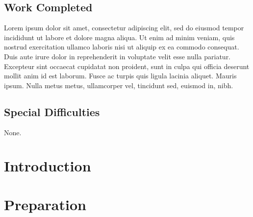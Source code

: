 \documentclass[12pt,a4paper,twoside,openright]{report}
\begin{document}
\section*{Work Completed}

Lorem ipsum dolor sit amet, consectetur adipiscing elit, sed do eiusmod tempor incididunt ut labore et dolore magna aliqua. Ut enim ad minim veniam, quis nostrud exercitation ullamco laboris nisi ut aliquip ex ea commodo consequat. Duis aute irure dolor in reprehenderit in voluptate velit esse nulla pariatur. Excepteur sint occaecat cupidatat non proident, sunt in culpa qui officia deserunt mollit anim id est laborum.
Fusce ac turpis quis ligula lacinia aliquet. Mauris ipsum. Nulla metus metus, ullamcorper vel, tincidunt sed, euismod in, nibh.

\section*{Special Difficulties}

None.

\newpage

\setcounter{tocdepth}{4}
\setcounter{secnumdepth}{4}
\tableofcontents


\newpage
{}
\setcounter{page}{1}







\chapter{Introduction}


\chapter{Preparation}

\end{document}

